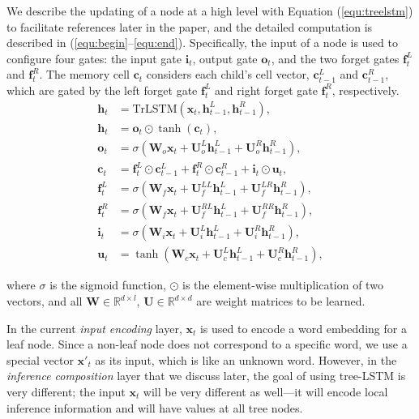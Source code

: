 \documentclass[11pt,a4paper]{article}
\newcommand{\vect}[1]{\mathbf{#1}}
\newcommand{\RR}[0]{\mathbb{R}}
\begin{document}
We describe the updating of a node at a high level with Equation (\ref{equ:treelstm}) to facilitate references later in the paper, and the detailed computation is described in (\ref{equ:begin}--\ref{equ:end}). Specifically, the input of a node is used to configure four gates: the input gate $\vect{i}_t$, output gate $\vect{o}_t$, and the two forget gates $\vect{f}_t^L$ and $\vect{f}_t^R$. The memory cell $\vect{c}_t$ considers each child's cell vector, $\vect{c}_{t-1}^L$ and $\vect{c}_{t-1}^R$, which are gated by the left forget gate $\vect{f}_t^L$ and right forget gate $\vect{f}_t^R$, respectively. 
{\fontsize{10pt}{1.0cm}
	\begin{align}
    \label{equ:treelstm}
        \vect{h}_t &= \text{TrLSTM}(\vect{x}_t, \vect{h}_{t-1}^L, \vect{h}_{t-1}^R), \\
		\label{equ:begin}
		\vect{h}_t &= \vect{o}_t \odot \tanh(\vect{c}_{t}),\\
		\vect{o}_t  &= \sigma (\vect{W}_o \vect{x}_t + \vect{U}_o^L \vect{h}_{t-1}^L +  \vect{U}_o^R \vect{h}_{t-1}^R), \\\vect{c}_t &= \vect{f}_t^L \odot \vect{c}_{t-1}^L + \vect{f}_t^R \odot \vect{c}_{t-1}^R  + \vect{i}_t \odot \vect{u}_t, \\
		\vect{f}_t^L  &= \sigma (\vect{W}_f \vect{x}_t + \vect{U}_f^{LL} \vect{h}_{t-1}^L +  \vect{U}_f^{LR} \vect{h}_{t-1}^R),\\
\vect{f}_t^R  &= \sigma (\vect{W}_f \vect{x}_t + \vect{U}_f^{RL} \vect{h}_{t-1}^L +  \vect{U}_f^{RR} \vect{h}_{t-1}^R), \\\vect{i}_t  &= \sigma (\vect{W}_i \vect{x}_t + \vect{U}_i^L \vect{h}_{t-1}^L +  \vect{U}_i^R \vect{h}_{t-1}^R), \\\vect{u}_t  &= \tanh (\vect{W}_c \vect{x}_t + \vect{U}_c^L \vect{h}_{t-1}^L +  \vect{U}_c^R \vect{h}_{t-1}^R),
    \label{equ:end}
	\end{align}
}

\noindent where $\sigma$ is the sigmoid function, $\odot$ is the element-wise multiplication of two vectors, and all $\vect{W} \in \RR^{d \times l}$, $\vect{U} \in \RR^{d \times d}$ are weight matrices to be learned. 

In the current \textit{input encoding} layer, $\vect{x}_t$ is used to encode a word embedding for a leaf node. Since a non-leaf node does not correspond to a specific word, we use a special vector $\vect{x}'_t$ as its input, which is like an unknown word. However, in the \textit{inference composition} layer that we discuss later, the goal of using tree-LSTM is very different; the input $\vect{x}_t$ will be very different as well---it will encode local inference information and will have values at all tree nodes. 
\end{document}
